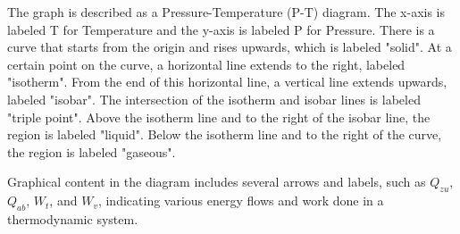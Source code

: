 The graph is described as a Pressure-Temperature (P-T) diagram. The x-axis is labeled T for Temperature and the y-axis is labeled P for Pressure. There is a curve that starts from the origin and rises upwards, which is labeled "solid". At a certain point on the curve, a horizontal line extends to the right, labeled "isotherm". From the end of this horizontal line, a vertical line extends upwards, labeled "isobar". The intersection of the isotherm and isobar lines is labeled "triple point". Above the isotherm line and to the right of the isobar line, the region is labeled "liquid". Below the isotherm line and to the right of the curve, the region is labeled "gaseous".

Graphical content in the diagram includes several arrows and labels, such as \(Q_{zu}\), \(Q_{ab}\), \(W_{t}\), and \(W_{v}\), indicating various energy flows and work done in a thermodynamic system.